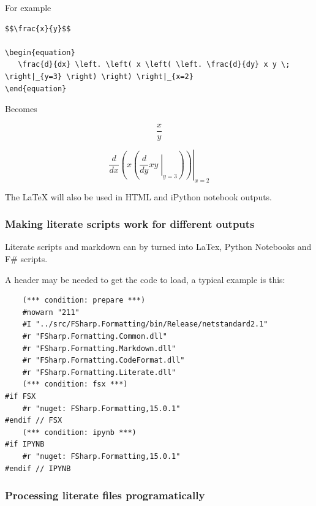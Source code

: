 \documentclass{article}
\begin{document}
For example
\begin{lstlisting}
$$\frac{x}{y}$$

\begin{equation}
   \frac{d}{dx} \left. \left( x \left( \left. \frac{d}{dy} x y \; \right|_{y=3} \right) \right) \right|_{x=2}
\end{equation}

\end{lstlisting}


Becomes


\begin{equation}
\frac{x}{y}
\end{equation}




\begin{equation}
   \frac{d}{dx} \left. \left( x \left( \left. \frac{d}{dy} x y \; \right|_{y=3} \right) \right) \right|_{x=2}
\end{equation}




The LaTeX will also be used in HTML and iPython notebook outputs.
\subsubsection*{Making literate scripts work for different outputs}



Literate scripts and markdown can by turned into LaTex, Python Notebooks and F\# scripts.


A header may be needed to get the code to load, a typical example is this:
\begin{lstlisting}
    (*** condition: prepare ***)
    #nowarn "211"
    #I "../src/FSharp.Formatting/bin/Release/netstandard2.1"
    #r "FSharp.Formatting.Common.dll"
    #r "FSharp.Formatting.Markdown.dll"
    #r "FSharp.Formatting.CodeFormat.dll"
    #r "FSharp.Formatting.Literate.dll"
    (*** condition: fsx ***)
#if FSX
    #r "nuget: FSharp.Formatting,15.0.1"
#endif // FSX
    (*** condition: ipynb ***)
#if IPYNB
    #r "nuget: FSharp.Formatting,15.0.1"
#endif // IPYNB

\end{lstlisting}
\subsubsection*{Processing literate files programatically}
\end{document}
